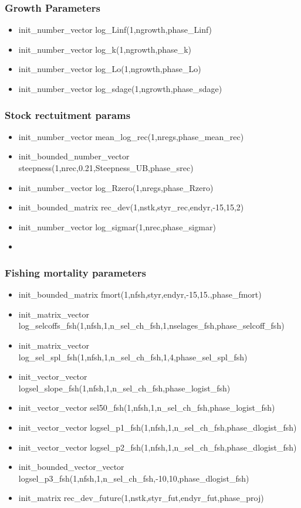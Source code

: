 \documentclass{article}
\begin{document}
\subsubsection{Growth Parameters}
\begin{itemize}
    \item init\_number\_vector log\_Linf(1,ngrowth,phase\_Linf)
    \item init\_number\_vector log\_k(1,ngrowth,phase\_k)
    \item init\_number\_vector log\_Lo(1,ngrowth,phase\_Lo)
    \item init\_number\_vector log\_sdage(1,ngrowth,phase\_sdage)
    
\end{itemize}
\subsubsection{Stock rectuitment params}
\begin{itemize}
    \item init\_number\_vector mean\_log\_rec(1,nregs,phase\_mean\_rec)
    \item init\_bounded\_number\_vector steepness(1,nrec,0.21,Steepness\_UB,phase\_srec)
    \item init\_number\_vector log\_Rzero(1,nregs,phase\_Rzero)
    \item init\_bounded\_matrix rec\_dev(1,nstk,styr\_rec,endyr,-15,15,2)
    \item init\_number\_vector log\_sigmar(1,nrec,phase\_sigmar)
    \item 
\end{itemize}
\subsubsection{Fishing mortality parameters}
\begin{itemize}
    \item init\_bounded\_matrix fmort(1,nfsh,styr,endyr,-15,15.,phase\_fmort)
    \item init\_matrix\_vector log\_selcoffs\_fsh(1,nfsh,1,n\_sel\_ch\_fsh,1,nselages\_fsh,phase\_selcoff\_fsh)
    \item init\_matrix\_vector  log\_sel\_spl\_fsh(1,nfsh,1,n\_sel\_ch\_fsh,1,4,phase\_sel\_spl\_fsh)
    \item init\_vector\_vector logsel\_slope\_fsh(1,nfsh,1,n\_sel\_ch\_fsh,phase\_logist\_fsh)
    \item init\_vector\_vector     sel50\_fsh(1,nfsh,1,n\_sel\_ch\_fsh,phase\_logist\_fsh)
    \item init\_vector\_vector logsel\_p1\_fsh(1,nfsh,1,n\_sel\_ch\_fsh,phase\_dlogist\_fsh)
    \item init\_vector\_vector logsel\_p2\_fsh(1,nfsh,1,n\_sel\_ch\_fsh,phase\_dlogist\_fsh)
    \item init\_bounded\_vector\_vector logsel\_p3\_fsh(1,nfsh,1,n\_sel\_ch\_fsh,-10,10,phase\_dlogist\_fsh)
    \item init\_matrix rec\_dev\_future(1,nstk,styr\_fut,endyr\_fut,phase\_proj)
\end{itemize}
\end{document}
